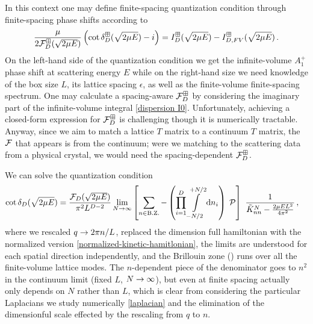 In this context one may define finite-spacing quantization condition through finite-spacing phase shifts according to
\begin{equation}
    \frac{\mu}{2 \mathcal{F}_D^\boxplus(\sqrt{2\mu E})}\left(\cot\delta_D^\boxplus(\sqrt{2\mu E})-i\right)
    =
    I_D^{\boxplus}(\sqrt{2\mu E}) - I_{D,FV}^{\boxplus}(\sqrt{2\mu E})
	\, .
\end{equation}
On the left-hand side of the quantization condition we get the infinite-volume $A_1^+$ phase shift at scattering energy $E$ while on the right-hand size we need knowledge of the box size $L$, its lattice spacing $\epsilon$, as well as the finite-volume finite-spacing spectrum.
One may calculate a spacing-aware $\mathcal{F}_D^\boxplus$ by considering the imaginary part of the infinite-volume integral \eqref{dispersion I0}.
Unfortunately, achieving a closed-form expression for $\mathcal{F}_D^\boxplus$ is challenging though it is numerically tractable.
Anyway, since we aim to match a lattice $T$ matrix to a continuum $T$ matrix, the $\mathcal{F}$ that appears is from the continuum; were we matching to the scattering data from a physical crystal, we would need the spacing-dependent $\mathcal{F}_D^\boxplus$.

We can solve the quantization condition
\begin{align}
    \cot \delta_D(\sqrt{2 \mu E})
    &=
    \frac{\mathcal{F}_D(\sqrt{2 \mu E})}{\pi^2 L^{D-2}}
    \lim_{N\rightarrow\infty}
    \left[
    	\sum_{n\in\text{B.Z.}} -
		\left(\prod_{i=1}^D
    		\int\limits_{-N/2}^{+N/2}
    		\mathrm{d} n_i
    	\right)\; \mathcal{P} 
	\right]\  \frac{1}{\tilde K_{nn}^{N}-\frac{2\mu E L^2}{4\pi^2}}
	\, ,
\end{align}
where we rescaled $q\rightarrow 2\pi n/L$, replaced the dimension full hamiltonian with the normalized version \eqref{normalized-kinetic-hamitlonian}, the limits are understood for each spatial direction independently, and the Brillouin zone (\BZ) runs over all the finite-volume lattice modes.
The $n$-dependent piece of the denominator goes to $n^2$ in the continuum limit (fixed $L$, $N\rightarrow\infty$), but even at finite spacing actually only depends on $N$ rather than $L$, which is clear from considering the particular Laplacians we study numerically \eqref{laplacian} and the elimination of the dimensionful scale effected by the rescaling from $q$ to $n$.

